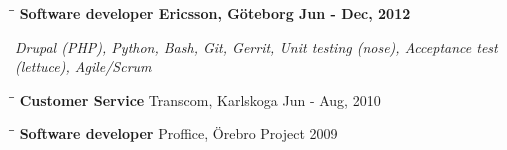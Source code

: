 \documentclass[11pt]{res}
\begin{document}
\begin{resume}
\vspace{-20pt}
\begin{tabbing}
 \hspace{2.3in}\= \hspace{2.6in}\= \kill %
 \bf {Software developer} \> Ericsson, Göteborg \>Jun - Dec, 2012
\end{tabbing}\vspace{-20pt}
\textit{Drupal (PHP), Python, Bash, Git, Gerrit, Unit testing (nose), Acceptance test (lettuce), Agile/Scrum}
\vspace{-20pt}
\begin{tabbing}
 \hspace{2.3in}\= \hspace{2.6in}\= \kill %
 {\bf Customer Service} \>Transcom, Karlskoga    \>Jun - Aug, 2010\\
\end{tabbing}\vspace{-40pt}
\begin{tabbing}
		  \hspace{2.3in}\= \hspace{2.6in}\= \kill %
		  {\bf Software developer} \>Proffice, Örebro \>Project 2009\\
\end{tabbing}\vspace{-30pt}

\end{resume}
\end{document}
